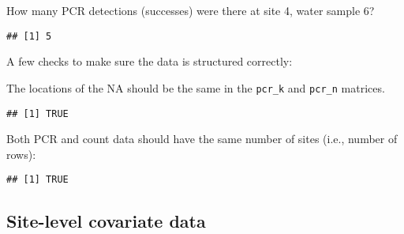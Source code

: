 \documentclass[
]{article}
\newenvironment{Shaded}{\begin{snugshade}}{\end{snugshade}}
\newcommand{\DecValTok}[1]{\textcolor[rgb]{0.00,0.00,0.81}{#1}}
\newcommand{\FunctionTok}[1]{\textcolor[rgb]{0.13,0.29,0.53}{\textbf{#1}}}
\newcommand{\NormalTok}[1]{#1}
\newcommand{\SpecialCharTok}[1]{\textcolor[rgb]{0.81,0.36,0.00}{\textbf{#1}}}
\begin{document}
How many PCR detections (successes) were there at site 4, water sample
6?

\begin{Shaded}
\end{Shaded}

\begin{verbatim}
## [1] 5
\end{verbatim}

A few checks to make sure the data is structured correctly:

The locations of the NA should be the same in the \texttt{pcr\_k} and
\texttt{pcr\_n} matrices.

\begin{Shaded}
\end{Shaded}

\begin{verbatim}
## [1] TRUE
\end{verbatim}

Both PCR and count data should have the same number of sites (i.e.,
number of rows):

\begin{Shaded}
\end{Shaded}

\begin{verbatim}
## [1] TRUE
\end{verbatim}

\subsection{Site-level covariate data}\label{site-level-covariate-data}
\end{document}
